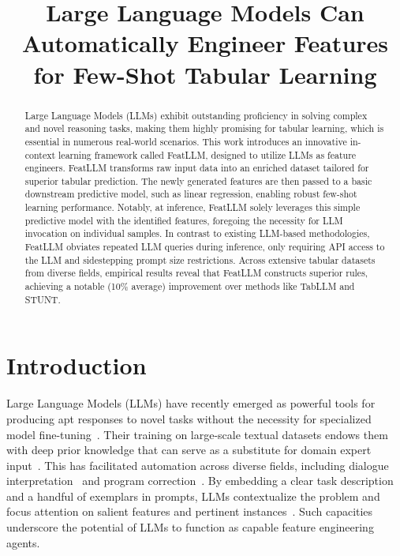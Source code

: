 \title{Large Language Models Can Automatically Engineer Features for Few-Shot Tabular Learning}

\begin{abstract}
Large Language Models (LLMs) exhibit outstanding proficiency in solving complex and novel reasoning tasks, making them highly promising for tabular learning, which is essential in numerous real-world scenarios. This work introduces an innovative in-context learning framework called \textsf{FeatLLM}, designed to utilize LLMs as feature engineers. \textsf{FeatLLM} transforms raw input data into an enriched dataset tailored for superior tabular prediction. The newly generated features are then passed to a basic downstream predictive model, such as linear regression, enabling robust few-shot learning performance. Notably, at inference, \textsf{FeatLLM} solely leverages this simple predictive model with the identified features, foregoing the necessity for LLM invocation on individual samples. In contrast to existing LLM-based methodologies, \textsf{FeatLLM} obviates repeated LLM queries during inference, only requiring API access to the LLM and sidestepping prompt size restrictions. Across extensive tabular datasets from diverse fields, empirical results reveal that \textsf{FeatLLM} constructs superior rules, achieving a notable (10\% average) improvement over methods like TabLLM and STUNT.
\end{abstract}

\section{Introduction}
Large Language Models (LLMs) have recently emerged as powerful tools for producing apt responses to novel tasks without the necessity for specialized model fine-tuning~\cite{creswell2022selection,imani2023mathprompter,taylor2022galactica}. Their training on large-scale textual datasets endows them with deep prior knowledge that can serve as a substitute for domain expert input~\cite{Genomes2021,singhal2023large,wilcox2003role}. This has facilitated automation across diverse fields, including dialogue interpretation~\cite{finch2023leveraging} and program correction~\cite{fan2023automated}. By embedding a clear task description and a handful of exemplars in prompts, LLMs contextualize the problem and focus attention on salient features and pertinent instances~\cite{brown2020language,zhao2023survey}. Such capacities underscore the potential of LLMs to function as capable feature engineering agents.

